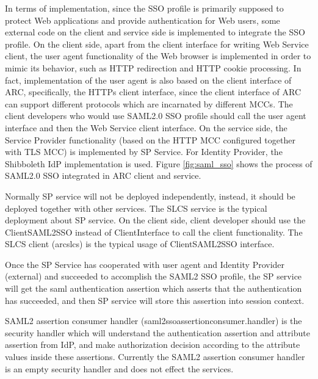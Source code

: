 \documentclass{article}                            %
\begin{document}
    In terms of implementation, since the SSO profile is primarily supposed to protect Web applications and provide authentication for Web users, some external code on the client and service side is implemented to integrate the SSO profile. On the client side, apart from the client interface for writing Web Service client, the user agent functionality of the Web browser is implemented in order to mimic its behavior, such as HTTP redirection and HTTP cookie processing. In fact, implementation of the user agent is also based on the client interface of ARC, specifically, the HTTPs client interface, since the client interface of ARC can support different protocols which are incarnated by different MCCs. The client developers who would use SAML2.0 SSO profile should call the user agent interface and then the Web Service client interface. On the service side, the Service Provider functionality (based on the HTTP MCC configured together with TLS MCC) is implemented by SP Service. For Identity Provider, the Shibboleth IdP implementation is used. Figure \ref{fig:saml_sso} shows the process of SAML2.0 SSO integrated in ARC client and service.

   Normally SP service will not be deployed independently, instead, it should be deployed together with other services. The SLCS service is the typical deployment about SP service. On the client side, client developer should use the ClientSAML2SSO instead of ClientInterface to call the client functionality. The SLCS client (arcslcs) is the typical usage of  ClientSAML2SSO interface.

    Once the SP Service has cooperated with user agent and Identity Provider (external) and succeeded to accomplish the SAML2 SSO profile,  the SP service will get the saml authentication assertion which asserts that the authentication has succeeded, and then SP service will store this assertion into session context.

    SAML2 assertion consumer handler (saml2ssoassertionconsumer.handler) is the security handler which will understand the authentication assertion and attribute assertion from IdP, and make authorization decision according to the attribute values inside these assertions. Currently the SAML2 assertion consumer handler is an empty security handler and does not effect the services.

\begin{figure}[ht]
\end{figure}
\end{document}
